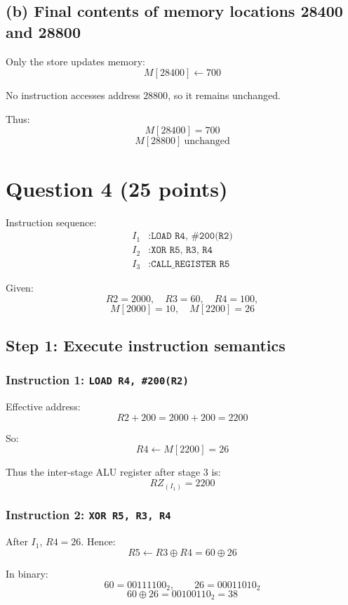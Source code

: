\documentclass[12pt,a4paper]{article}
\begin{document}
\subsection*{(b) Final contents of memory locations 28400 and 28800}

Only the store updates memory:
\[
M[28400]\leftarrow 700
\]

No instruction accesses address \(28800\), so it remains unchanged.

Thus:
\[
\boxed{M[28400]=700}
\]
\[
\boxed{M[28800]\ \text{unchanged}}
\]

\newpage
\section*{Question 4 (25 points)}

Instruction sequence:
\[
\begin{aligned}
I_1 &: \texttt{LOAD R4, \#200(R2)} \\
I_2 &: \texttt{XOR R5, R3, R4} \\
I_3 &: \texttt{CALL\_REGISTER R5}
\end{aligned}
\]

Given:
\[
R2=2000,\quad R3=60,\quad R4=100,
\]
\[
M[2000]=10,\quad M[2200]=26
\]

\subsection*{Step 1: Execute instruction semantics}

\subsubsection*{Instruction 1: \texttt{LOAD R4, \#200(R2)}}

Effective address:
\[
R2+200 = 2000+200 = 2200
\]

So:
\[
R4 \leftarrow M[2200] = 26
\]

Thus the inter-stage ALU register after stage 3 is:
\[
\boxed{RZ_{(I_1)} = 2200}
\]

\subsubsection*{Instruction 2: \texttt{XOR R5, R3, R4}}

After \(I_1\), \(R4=26\). Hence:
\[
R5 \leftarrow R3 \oplus R4 = 60 \oplus 26
\]

In binary:
\[
60 = 00111100_2,\qquad 26 = 00011010_2
\]
\[
60\oplus 26 = 00100110_2 = 38
\]
\end{document}
